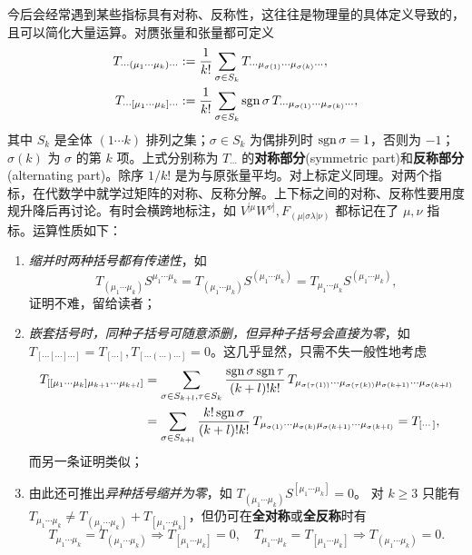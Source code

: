 今后会经常遇到某些指标具有对称、反称性，这往往是物理量的具体定义导致的，且可以简化大量运算。对赝张量和张量都可定义
\begin{align}
    T_{\cdots(\mu_1\cdots\mu_k)\cdots}&:=\frac{1}{k!}\sum_{\sigma\in S_k} T_{\cdots\mu_{\sigma(1)}\cdots\mu_{\sigma(k)}\cdots},\\
    T_{\cdots[\mu_1\cdots\mu_k]\cdots}&:=\frac{1}{k!}\sum_{\sigma\in S_k} \operatorname{sgn}\sigma\,T_{\cdots\mu_{\sigma(1)}\cdots\mu_{\sigma(k)}\cdots},
\end{align}
其中 $S_k$ 是全体 $(1\cdots k)$ 排列之集；$\sigma\in S_k$ 为偶排列时 $\operatorname{sgn}\sigma=1$，否则为 $-1$；$\sigma(k)$ 为 $\sigma$ 的第 $k$ 项。上式分别称为 $T_{\cdots}$ 的\textbf{对称部分}(symmetric part)和\textbf{反称部分}(alternating part)。除序 $1/k!$ 是为与原张量平均。对上标定义同理。对两个指标，在代数学中就学过矩阵的对称、反称分解。上下标之间的对称、反称性要用度规升降后再讨论。有时会横跨地标注，如 $V^{[\mu}W^{\nu]},F_{(\mu|\sigma\lambda|\nu)}$ 都标记在了 $\mu,\nu$ 指标。运算性质如下：
\begin{enumerate}
    \item \textit{缩并时两种括号都有传递性}，如
    \[T_{(\mu_1\cdots\mu_k)}S^{\mu_1\cdots\mu_k}=T_{(\mu_1\cdots\mu_k)}S^{(\mu_1\cdots\mu_k)}=T_{\mu_1\cdots\mu_k}S^{(\mu_1\cdots\mu_k)},\]
    证明不难，留给读者；
    \item \textit{嵌套括号时，同种子括号可随意添删，但异种子括号会直接为零}，如 $T_{[\cdots[\cdots]\cdots]}=T_{[\cdots]},T_{[\cdots(\cdots)\cdots]}=0$。这几乎显然，只需不失一般性地考虑
    \begin{align*}
        T_{[[\mu_1\cdots\mu_k]\mu_{k+1}\cdots\mu_{k+l}]}&=\sum_{\sigma\in S_{k+l},\tau\in S_k}\frac{\operatorname{sgn}\sigma\operatorname{sgn}\tau}{(k+l)!k!}\,T_{\mu_{\sigma(\tau(1))}\cdots\mu_{\sigma(\tau(k))}\mu_{\sigma(k+1)}\cdots\mu_{\sigma(k+l)}}\\
        &=\sum_{\sigma\in S_{k+l}}\frac{k!\operatorname{sgn}\sigma}{(k+l)!k!}\,T_{\mu_{\sigma(1)}\cdots\mu_{\sigma(k)}\mu_{\sigma(k+1)}\cdots\mu_{\sigma(k+l)}}=T_{[\cdots]},
    \end{align*}
    而另一条证明类似；
    \item 由此还可推出\textit{异种括号缩并为零}，如 $T_{(\mu_1\cdots\mu_k)}S^{[\mu_1\cdots\mu_k]}=0$。
    对 $k\geqslant 3$ 只能有 $T_{\mu_1\cdots\mu_k}\ne T_{(\mu_1\cdots\mu_k)}+T_{[\mu_1\cdots\mu_k]}$，但仍可在\textbf{全对称}或\textbf{全反称}时有
    \[T_{\mu_1\cdots\mu_k}=T_{(\mu_1\cdots\mu_k)}\Rightarrow T_{[\mu_1\cdots\mu_k]}=0,\quad
        T_{\mu_1\cdots\mu_k}=T_{[\mu_1\cdots\mu_k]}\Rightarrow T_{(\mu_1\cdots\mu_k)}=0.\]
\end{enumerate}

